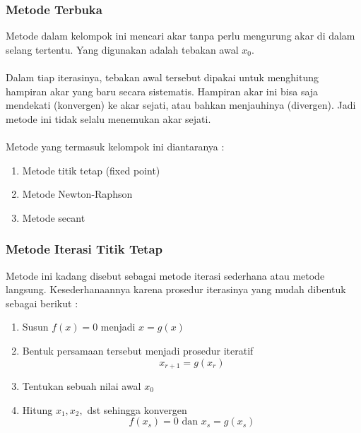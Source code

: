 \documentclass{beamer}
\begin{document}

\begin{frame}
\frametitle{Metode Terbuka}
Metode dalam kelompok ini mencari akar tanpa perlu mengurung akar di dalam selang tertentu. Yang digunakan adalah tebakan awal $x_0$. 
\\\ \\Dalam tiap iterasinya, tebakan awal tersebut dipakai untuk menghitung hampiran akar yang baru secara sistematis. Hampiran akar ini bisa saja mendekati (konvergen) ke akar sejati, atau bahkan menjauhinya (divergen). Jadi metode ini tidak selalu menemukan akar sejati.
\\\ \\Metode yang termasuk kelompok ini diantaranya :
\begin{enumerate}
\item Metode titik tetap (fixed point)
\item Metode Newton-Raphson
\item Metode secant
\end{enumerate}

\end{frame}


\begin{frame}
\frametitle{Metode Iterasi Titik Tetap}
Metode ini kadang disebut sebagai metode iterasi sederhana atau metode langsung. Kesederhanaannya karena prosedur iterasinya yang mudah dibentuk sebagai berikut :
\begin{enumerate}
\item Susun $f(x) = 0$ menjadi $x = g(x)$
\item Bentuk persamaan tersebut menjadi prosedur iteratif
\begin{equation}
x_{r+1} = g(x_r)
\nonumber
\end{equation}
\item Tentukan sebuah nilai awal $x_0$
\item Hitung $x_1,x_2,$ dst sehingga konvergen
\begin{equation}
f(x_s) = 0 \text{ dan } x_{s} = g(x_s)
\nonumber
\end{equation}
\end{enumerate}
\end{frame}

\end{document}

